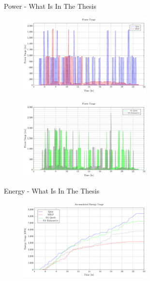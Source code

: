 \documentclass[bigger]{beamer}
\begin{document}
\begin{frame}[label={sec:org8c7ded1}]{Power - What Is In The Thesis}
\begin{figure}[htpb]
\centering
    \includegraphics[width=0.6\textwidth]{img/sa-pap-paper-bad/power-milp-qin}
\end{figure}
\begin{figure}[htpb]
\centering
    \includegraphics[width=0.6\textwidth]{img/sa-pap-paper-bad/power-sa}
\end{figure}
\end{frame}
\begin{frame}[label={sec:orgf8736ba}]{Energy - What Is In The Thesis}
\begin{figure}[htpb]
\centering
    \includegraphics[width=0.6\textwidth]{img/sa-pap-paper-bad/energy}
\end{figure}
\end{frame}
\end{document}

